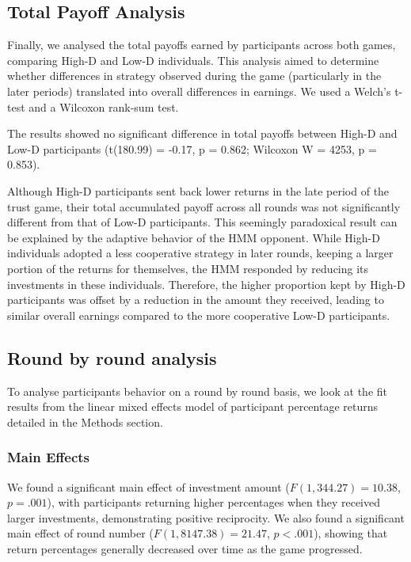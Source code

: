 \documentclass[
]{article}
\begin{document}
\subsection{Total Payoff Analysis}\label{total-payoff-analysis}

Finally, we analysed the total payoffs earned by participants across both games, comparing High-D and Low-D individuals. This analysis aimed to determine whether differences in strategy observed during the game (particularly in the later periods) translated into overall differences in earnings. We used a Welch's t-test and a Wilcoxon rank-sum test.

The results showed no significant difference in total payoffs between High-D and Low-D participants (t(180.99) = -0.17, p = 0.862; Wilcoxon W = 4253, p = 0.853).

Although High-D participants sent back lower returns in the late period of the trust game, their total accumulated payoff across all rounds was not significantly different from that of Low-D participants. This seemingly paradoxical result can be explained by the adaptive behavior of the HMM opponent. While High-D individuals adopted a less cooperative strategy in later rounds, keeping a larger portion of the returns for themselves, the HMM responded by reducing its investments in these individuals. Therefore, the higher proportion kept by High-D participants was offset by a reduction in the amount they received, leading to similar overall earnings compared to the more cooperative Low-D participants.

\subsection{Round by round analysis}\label{round-by-round-analysis}

To analyse participants behavior on a round by round basis, we look at the fit results from the linear mixed effects model of participant percentage returns detailed in the Methods section.

\subsubsection{Main Effects}\label{main-effects}

We found a significant main effect of investment amount (\(F(1, 344.27) = 10.38\), \(p = .001\)), with participants returning higher percentages when they received larger investments, demonstrating positive reciprocity. We also found a significant main effect of round number (\(F(1, 8147.38) = 21.47\), \(p < .001\)), showing that return percentages generally decreased over time as the game progressed.
\end{document}
